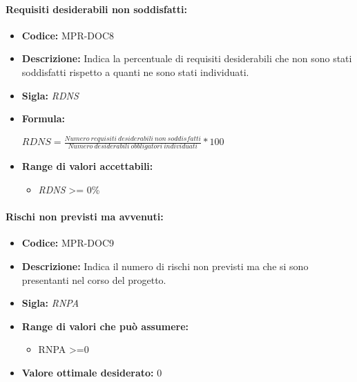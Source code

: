 \paragraph{Requisiti desiderabili non soddisfatti:}
\begin{itemize}
  \item \textbf{Codice:} MPR-DOC8
  \item \textbf{Descrizione:} Indica la percentuale di requisiti desiderabili che non sono stati  soddisfatti rispetto a quanti ne sono stati individuati.
  \item \textbf{Sigla:} \textit{RDNS}
  \item \textbf{Formula:}
  \begin{center}
    \(RDNS=\frac{Numero\ requisiti\ desiderabili\ non\ soddisfatti}{Numero\ desiderabili\  obbligatori\ individuati}*100\)
  \end{center}
  \item \textbf{Range di valori accettabili:}
  \begin{itemize}
      \item \textit{RDNS} >= 0\%
  
  \end{itemize}
\end{itemize}




\paragraph{Rischi non previsti ma avvenuti:}
\begin{itemize}
    \item \textbf{Codice:} MPR-DOC9
    \item \textbf{Descrizione:} Indica il numero di rischi non previsti ma che si sono presentanti nel corso del progetto.
    \item \textbf{Sigla:} \textit{RNPA}
    \item \textbf{Range di valori che può assumere:}
    \begin{itemize}
        \item  RNPA >=0
    \end{itemize}
    \item \textbf{Valore ottimale desiderato:} 0
    

    
\end{itemize}












